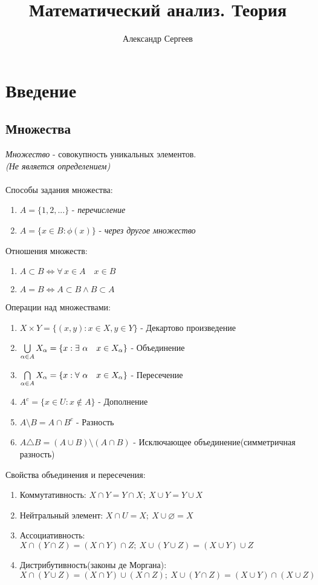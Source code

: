 \documentclass[12pt]{article}
\title{Математический анализ. Теория}
\author{Александр Сергеев}
\date{}
\begin{document}
\maketitle
\section{Введение}
\subsection{Множества}
\textit{Множество} - совокупность уникальных элементов. \\\textit{(Не является определением)}\\\\
Способы задания множества:
\begin{enumerate}
    \item $A = \{1,2, ...\}$ - \textit{перечисление}
    \item $A = \{ x \in B: \phi (x) \}$ - \textit{через другое множество}
\end{enumerate}
Отношения множеств:
\begin{enumerate}
    \item $A \subset B \Leftrightarrow \forall\,x \in A \quad x \in B$
    \item $A = B \Leftrightarrow A \subset B \land B \subset A$
\end{enumerate}
Операции над множествами:
\begin{enumerate}
    \item $X \times Y = \{ (x,y): x \in X, y \in Y\}$ - Декартово произведение 
    \item $\bigcup\limits_{\alpha \in A} X_\alpha = \{ x: \exists\ \alpha\quad x \in X_\alpha\}$ - Объединение
    \item $\bigcap\limits_{\alpha \in A} X_\alpha = \{ x: \forall\ \alpha\quad x \in X_\alpha\}$ - Пересечение
    \item $A^c = \{ x \in U: x \notin A \}$ - Дополнение
    \item $A \setminus B = A \cap B^c$ - Разность
    \item $A \triangle B = (A \cup B) \setminus (A \cap B)$ - Исключающее объединение(симметричная разность)
\end{enumerate}
Свойства объединения и пересечения:
\begin{enumerate}
    \item Коммутативность: $X \cap Y = Y \cap X;\ X \cup Y = Y \cup X$
    \item Нейтральный элемент: $X \cap U = X;\ X \cup \varnothing = X$
    \item Ассоциативность: $X\cap(Y \cap Z) = (X \cap Y)\cap Z;\ X \cup (Y \cup Z) = (X \cup Y) \cup Z$
    \item Дистрибутивность(законы де Моргана):\\ $X\cap(Y\cup Z) = (X \cap Y) \cup (X \cap Z);\ X\cup(Y\cap Z) = (X \cup Y) \cap (X \cup Z)$
\end{enumerate}
\end{document}
